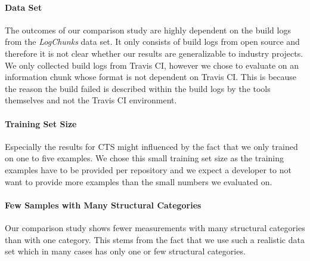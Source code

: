 \documentclass[\myrootdir/main.tex]{subfiles}
\begin{document}
\paragraph{Data Set}
The outcomes of our comparison study are highly dependent on the build logs from the \emph{LogChunks} data set.
It only consists of build logs from open source and therefore it is not clear whether our results are generalizable to industry projects.
We only collected build logs from Travis CI, however we chose to evaluate on an information chunk whose format is not dependent on Travis CI\@.
This is because the reason the build failed is described within the build logs by the tools themselves and not the Travis CI environment.

\paragraph{Training Set Size}
Especially the results for CTS might influenced by the fact that we only trained on one to five examples.
We chose this small training set size as the training examples have to be provided per repository and we expect a developer to not want to provide more examples than the small numbers we evaluated on.

\paragraph{Few Samples with Many Structural Categories}
Our comparison study shows fewer measurements with many structural categories than with one category.
This stems from the fact that we use such a realistic data set which in many cases has only one or few structural categories.


\end{document}
